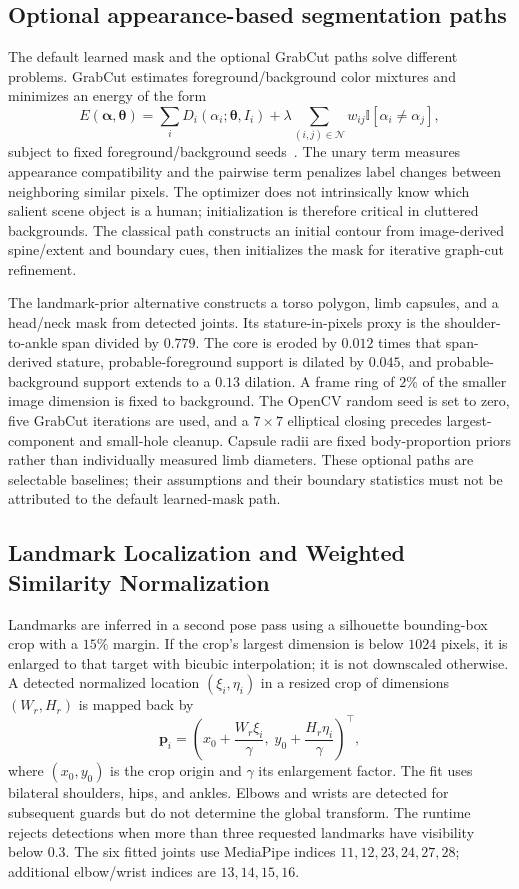 \documentclass[11pt,a4paper]{article}
\numberwithin{equation}{section}
\newcommand{\indic}{\mathbb I}
\begin{document}
\subsection{Optional appearance-based segmentation paths}
The default learned mask and the optional GrabCut paths solve different problems. GrabCut estimates foreground/background color mixtures and minimizes an energy of the form
\begin{equation}
E(\boldsymbol\alpha,\boldsymbol\theta)=
\sum_iD_i(\alpha_i;\boldsymbol\theta,I_i)+
\lambda\sum_{(i,j)\in\mathcal N}w_{ij}\indic[\alpha_i\ne\alpha_j],
\end{equation}
subject to fixed foreground/background seeds~\cite{rother2004grabcut}. The unary term measures appearance compatibility and the pairwise term penalizes label changes between neighboring similar pixels. The optimizer does not intrinsically know which salient scene object is a human; initialization is therefore critical in cluttered backgrounds. The classical path constructs an initial contour from image-derived spine/extent and boundary cues, then initializes the mask for iterative graph-cut refinement.

The landmark-prior alternative constructs a torso polygon, limb capsules, and a head/neck mask from detected joints. Its stature-in-pixels proxy is the shoulder-to-ankle span divided by $0.779$. The core is eroded by $0.012$ times that span-derived stature, probable-foreground support is dilated by $0.045$, and probable-background support extends to a $0.13$ dilation. A frame ring of $2\%$ of the smaller image dimension is fixed to background. The OpenCV random seed is set to zero, five GrabCut iterations are used, and a $7\times7$ elliptical closing precedes largest-component and small-hole cleanup. Capsule radii are fixed body-proportion priors rather than individually measured limb diameters. These optional paths are selectable baselines; their assumptions and their boundary statistics must not be attributed to the default learned-mask path.

\subsection{Landmark Localization and Weighted Similarity Normalization}
\label{subsec:procrustes}
Landmarks are inferred in a second pose pass using a silhouette bounding-box crop with a $15\%$ margin. If the crop's largest dimension is below $1024$ pixels, it is enlarged to that target with bicubic interpolation; it is not downscaled otherwise. A detected normalized location $(\xi_i,\eta_i)$ in a resized crop of dimensions $(W_r,H_r)$ is mapped back by
\begin{equation}
\mathbf p_i=\left(x_0+\frac{W_r\xi_i}{\gamma},\;y_0+\frac{H_r\eta_i}{\gamma}\right)^\top,
\end{equation}
where $(x_0,y_0)$ is the crop origin and $\gamma$ its enlargement factor. The fit uses bilateral shoulders, hips, and ankles. Elbows and wrists are detected for subsequent guards but do not determine the global transform. The runtime rejects detections when more than three requested landmarks have visibility below $0.3$. The six fitted joints use MediaPipe indices $11,12,23,24,27,28$; additional elbow/wrist indices are $13,14,15,16$.
\end{document}
